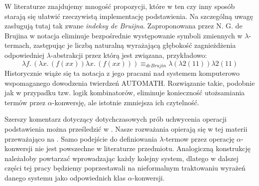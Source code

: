 W literaturze znajdujemy mnogość propozycji, które w ten czy inny sposób starają się ułatwić rzeczywistą implementację podstawienia. Na szczególną uwagę zasługują tutaj tak zwane \emph{indeksy de Bruijna}. Zaproponowana przez N. G. de Brujina w \cite{deBruijnIndices}  notacja eliminuje bezpośrednie występowanie symboli zmiennych w \(\lambda\)-termach, zastępując je liczbą naturalną wyrażającą głębokość zagnieżdżenia odpowiedniej \(\lambda\)-abstrakcji przez którą jest związana, przykładowo:
\[
  \lambda f.\,(\lambda x.\,(f(xx))\lambda x.\,(f(xx))) \equiv_{de Brujin} \lambda (\lambda 2 (1 1)) \lambda 2 (1 1)
\]
Historycznie wiąże się ta notacja z jego pracami nad systemem komputerowo wspomaganego dowodzenia twierdzeń AUTOMATH. Rozwiązanie takie, podobnie jak w przypadku tzw. logik kombinatorów, eliminuje konieczność utożsamiania termów przez \(\alpha\)-konwersję, ale istotnie zmniejsza ich czytelność.

Szerszy komentarz dotyczący dotychczasowych prób uchwycenia operacji podstawienia można prześledzić w \cite{txa:alpha-draft}. Nasze rozważania opierają się w tej materii przeważająco na \cite{Urzyczyn2006}. Samo podejście do definiowania \(\lambda\)-termow przez operację \(\alpha\)-konwersji nie jest powszechne w literaturze przedmiotu. Analogiczną konstrukcję należałoby powtarzać wprowadzając każdy kolejny system, dlatego w dalszej części tej pracy będziemy poprzestawali na nieformalnym traktowaniu wyrażeń danego systemu jako odpowiednich klas \(\alpha\)-konwersji.


